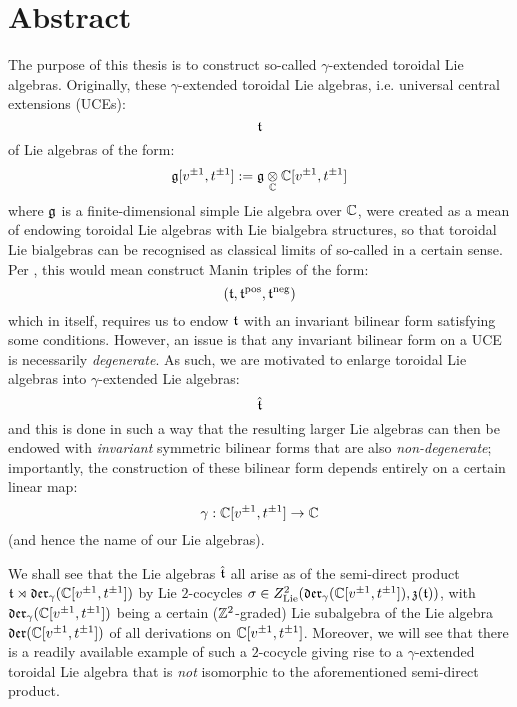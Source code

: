 \section*{Abstract}
    The purpose of this thesis is to construct so-called $\gamma$-extended toroidal Lie algebras. Originally, these $\gamma$-extended toroidal Lie algebras, i.e. universal central extensions (UCEs):
        $$\mathfrak{t}$$
    of Lie algebras of the form:
        $$\g[v^{\pm 1}, t^{\pm 1}] := \g \tensor_{\bbC} \bbC[v^{\pm 1}, t^{\pm 1}]$$
    where $\mathfrak{g}$ is a finite-dimensional simple Lie algebra over $\mathbb{C}$, were created as a mean of endowing toroidal Lie algebras with Lie bialgebra structures, so that toroidal Lie bialgebras can be recognised as classical limits of so-called  in a certain sense. Per \cite{etingof_kazhdan_quantisation_1}, this would mean construct Manin triples of the form:
        $$(\mathfrak{t}, \mathfrak{t}^{\mathrm{pos}}, \mathfrak{t}^{\mathrm{neg}})$$
    which in itself, requires us to endow $\mathfrak{t}$ with an invariant bilinear form satisfying some conditions. However, an issue is that any invariant bilinear form on a UCE is necessarily \textit{degenerate}. As such, we are motivated to enlarge toroidal Lie algebras into $\gamma$-extended Lie algebras:
        $$\hat{\mathfrak{t}}$$
    and this is done in such a way that the resulting larger Lie algebras can then be endowed with \textit{invariant} symmetric bilinear forms that are also \textit{non-degenerate}; importantly, the construction of these bilinear form depends entirely on a certain linear map:
        $$\gamma: \mathbb{C}[v^{\pm 1}, t^{\pm 1}] \to \mathbb{C}$$
    (and hence the name of our Lie algebras).
    
    We shall see that the Lie algebras $\hat{\mathfrak{t}}$ all arise as  of the semi-direct product $\mathfrak{t} \rtimes \mathfrak{der}_{\gamma}(\mathbb{C}[v^{\pm 1}, t^{\pm 1}])$ by Lie $2$-cocycles $\sigma \in Z^2_{\mathrm{Lie}}(\mathfrak{der}_{\gamma}(\mathbb{C}[v^{\pm 1}, t^{\pm 1}]), \mathfrak{z}(\mathfrak{t}))$, with $\mathfrak{der}_{\gamma}(\mathbb{C}[v^{\pm 1}, t^{\pm 1}])$ being a certain ($\mathbb{Z}^2$-graded) Lie subalgebra of the Lie algebra $\mathfrak{der}(\mathbb{C}[v^{\pm 1}, t^{\pm 1}])$ of all derivations on $\mathbb{C}[v^{\pm 1}, t^{\pm 1}]$. Moreover, we will see that there is a readily available example of such a $2$-cocycle giving rise to a $\gamma$-extended toroidal Lie algebra that is \textit{not} isomorphic to the aforementioned semi-direct product.